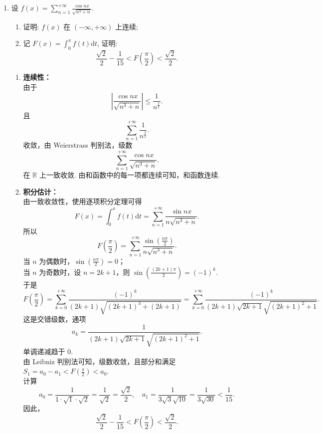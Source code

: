 \begin{enumerate}
    \item[4.]设 \(\displaystyle f(x) = \sum_{n = 1}^{+\infty} \frac{\cos nx}{\sqrt{n^3 + n}}\).
    \begin{enumerate}
        \item[(a)]证明: \(f(x)\) 在 \((- \infty, + \infty)\) 上连续;
        \item[(b)]记 \(\displaystyle F(x) = \int_{0}^{x}f(t)\mathrm{d}t\), 证明:
        \[\displaystyle \frac{\sqrt{2}}{2} -\frac{1}{15} < F\left(\frac{\pi}{2}\right)< \frac{\sqrt{2}}{2}.\]
    \end{enumerate}
    \begin{solution}
        \begin{enumerate}
        \item[(a)] \textbf{连续性：} \\
        由于 
        \[
        \left|\frac{\cos nx}{\sqrt{n^3+n}}\right| \le \frac{1}{n^{\frac{3}{2}}}.
        \]
        且 
        \[
        \sum_{n=1}^{+\infty} \frac{1}{n^{\frac{3}{2}}}.
        \]
        收敛，由 Weierstrass 判别法，级数
        \[
        \sum_{n=1}^{+\infty}\frac{\cos nx}{\sqrt{n^3+n}}.
        \]
        在 $\mathbb{R}$ 上一致收敛. 由和函数中的每一项都连续可知，和函数连续.

        \item[(b)] \textbf{积分估计：} \\
        由一致收敛性，使用逐项积分定理可得
        \[
        F(x) = \int_0^x f(t) \mathrm{d}t = \sum_{n=1}^{+\infty} \frac{\sin nx}{n\sqrt{n^3+n}}.
        \]
        所以
        \[
        F\left(\frac{\pi}{2}\right) = \sum_{n=1}^{+\infty} \frac{\sin(\frac{n\pi}{2})}{n\sqrt{n^3+n}}.
        \]
        当 $n$ 为偶数时，$\displaystyle \sin\left(\frac{n\pi}{2}\right)=0$；\\
        当 $n$ 为奇数时，设 $n=2k+1$，则 $\displaystyle \sin\left(\frac{(2k+1)\pi}{2}\right)=(-1)^k$.\\
        于是
        \[
        F\left(\frac{\pi}{2}\right) = \sum_{k=0}^{+\infty} \frac{(-1)^k}{(2k+1)\sqrt{(2k+1)^3+(2k+1)}} = \sum_{k=0}^{+\infty} \frac{(-1)^k}{(2k+1)\sqrt{2k+1}\sqrt{(2k+1)^2+1}}.
        \]
        这是交错级数，通项 
        \[
        a_k = \frac{1}{(2k+1)\sqrt{2k+1}\sqrt{(2k+1)^2+1}}.
        \]
        单调递减趋于 0.\\
        由 Leibniz 判别法可知，级数收敛，且部分和满足 $\displaystyle S_1 = a_0 - a_1 < F(\frac{\pi}{2}) < a_0$.\\
        计算
        \[
        a_0 = \frac{1}{1\cdot\sqrt{1}\cdot\sqrt{2}} = \frac{1}{\sqrt{2}} = \frac{\sqrt{2}}{2}, \quad a_1 = \frac{1}{3\sqrt{3}\sqrt{10}} = \frac{1}{3\sqrt{30}} < \frac{1}{15}.
        \]
        因此，
        \[
        \frac{\sqrt{2}}{2} - \frac{1}{15} < F\left(\frac{\pi}{2}\right) < \frac{\sqrt{2}}{2}. 
        \]
        \end{enumerate}
    \end{solution}


\end{enumerate}
